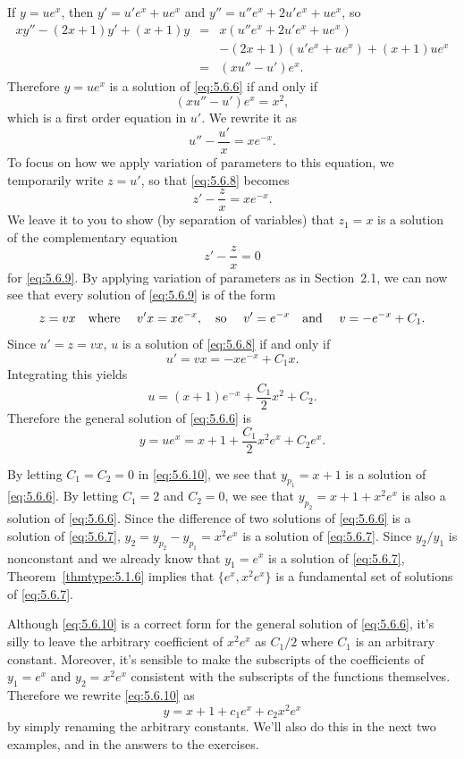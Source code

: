 \begin{examplesolution}
 If $y=ue^{x}$, then $y'=u'e^{x}+ue^{x}$ and $y''=u''e^{x}+2u'e^{x}+ue^{x}$, so
\begin{eqnarray*}
  xy''-(2x+1)y'+(x+1)y & = & x(u''e^{x}+2u'e^{x}+ue^{x})         \\
                       &   & -(2x+1)(u'e^{x}+ue^{x})+(x+1)ue^{x} \\
                       & = & (xu''-u')e^{x}.
\end{eqnarray*}
Therefore $y=ue^{x}$ is a solution of \eqref{eq:5.6.6} if and only if
\[
  (xu''-u')e^{x}=x^{2},
\]
which is a first order equation in $u'$. We rewrite it as
\begin{equation}
  \label{eq:5.6.8}u''-\frac{u'}{x}=xe^{-x}.
\end{equation}
To focus on how we apply variation of parameters to this equation, we temporarily write $z=u'$, so
that \eqref{eq:5.6.8} becomes
\begin{equation}
  \label{eq:5.6.9}z'-\frac{z}{x}=xe^{-x}.
\end{equation}
We leave it to you to show (by separation of variables) that $z_{1}=x$ is a solution of the
complementary equation
\[
  z'-\frac{z}{x}=0
\]
for \eqref{eq:5.6.9}. By applying variation of parameters as in Section~2.1, we can now see that
every solution of \eqref{eq:5.6.9} is of the form
\[
  z=vx\mbox{\quad where \quad}v'x=xe^{-x},\mbox{\quad so \quad}v'=e^{-x}\mbox{\quad and \quad}v=-e^{-x}+C_{1}.
\]
Since $u'=z=vx$, $u$ is a solution of \eqref{eq:5.6.8} if and only if
\[
  u'=vx=-xe^{-x}+C_{1}x.
\]
Integrating this yields
\[
  u=(x+1)e^{-x}+\frac{C_{1}}{2}x^{2}+C_{2}.
\]
Therefore the general solution of \eqref{eq:5.6.6} is
\begin{equation}
  \label{eq:5.6.10}y=ue^{x}=x+1+\frac{C_{1}}{2}x^{2}e^{x}+C_{2}e^{x}.
\end{equation}

 By letting $C_{1}=C_{2}=0$ in \eqref{eq:5.6.10}, we see that $y_{p_{1}}=x+1$ is a
solution of \eqref{eq:5.6.6}. By letting $C_{1}=2$ and $C_{2}=0$, we see that
$y_{p_{2}}=x+1+x^{2}e^{x}$ is also a solution of \eqref{eq:5.6.6}. Since the difference of two
solutions of \eqref{eq:5.6.6} is a solution of \eqref{eq:5.6.7},
$y_{2}=y_{p_{2}}-y_{p_{1}}=x^{2}e^{x}$ is a solution of \eqref{eq:5.6.7}. Since $y_{2}/y_{1}$ is
nonconstant and we already know that $y_{1}=e^{x}$ is a solution of \eqref{eq:5.6.7},
Theorem~\ref{thmtype:5.1.6} implies that $\{e^{x},x^{2}e^{x}\}$ is a fundamental set of solutions of
\eqref{eq:5.6.7}.\bbox

Although \eqref{eq:5.6.10} is a correct form for the general solution of \eqref{eq:5.6.6}, it's
silly to leave the arbitrary coefficient of $x^{2}e^{x}$ as $C_{1}/2$ where $C_{1}$ is an arbitrary
constant. Moreover, it's sensible to make the subscripts of the coefficients of $y_{1}=e^{x}$ and
$y_{2}=x^{2}e^{x}$ consistent with the subscripts of the functions themselves. Therefore we rewrite
\eqref{eq:5.6.10} as
\[
  y=x+1+c_{1}e^{x}+c_{2}x^{2}e^{x}
\]
by simply renaming the arbitrary constants. We'll also do this in the next two examples, and in the
answers to the exercises.
\end{examplesolution}

